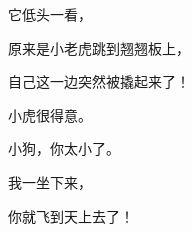 \newpage
{} %
\vspace*{15pt}
{\linespread{1.5}\fontsize{18}{18}\selectfont
\par
它低头一看，\par
原来是小老虎跳到翘翘板上，\par
自己这一边突然被撬起来了！\par
小虎很得意。\par
小狗，你太小了。\par
我一坐下来，\par
你就飞到天上去了！\par
\par
\par}
\ClearShipoutPicture



